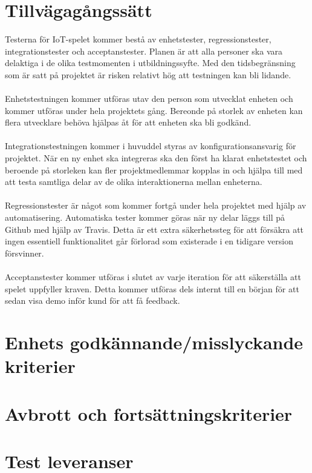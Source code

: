 \documentclass[10pt]{article}
\begin{document}
\section{Tillvägagångssätt}
	Testerna för IoT-spelet kommer bestå av enhetstester, regressionstester, integrationstester och acceptanstester. Planen är att alla personer ska vara delaktiga i de olika 		testmomenten i utbildningssyfte. Med den tidsbegränsning som är satt på projektet är risken relativt hög att testningen kan bli lidande. \\
	\\
	Enhetstestningen kommer utföras utav den person som utvecklat enheten och kommer utföras under hela projektets gång. Bereonde på storlek av enheten kan flera utvecklare behöva hjälpas åt för att enheten ska bli godkänd.\\
	\\
	Integrationstestningen kommer i huvuddel styras av konfigurationsansvarig för projektet. När en ny enhet ska integreras ska den först ha klarat enhetstestet och beroende på storleken kan fler projektmedlemmar kopplas in och hjälpa till med att testa samtliga delar av de olika interaktionerna mellan enheterna. \\
	\\
	Regressionstester är något som kommer fortgå under hela projektet med hjälp av automatisering. Automatiska tester kommer göras när ny delar läggs till på Github med hjälp av {\color{red}Travis}. Detta är ett extra säkerhetssteg för att försäkra att ingen essentiell funktionalitet går förlorad som existerade i en tidigare version försvinner.\\
	\\
	Acceptanstester kommer utföras i slutet av varje iteration för att säkerställa att spelet uppfyller kraven. Detta kommer utföras dels internt till en början för att sedan visa demo inför kund för att få feedback. 
	
	

\section{Enhets godkännande/misslyckande kriterier}
\section{Avbrott och fortsättningskriterier}
\section{Test leveranser}
\end{document}
